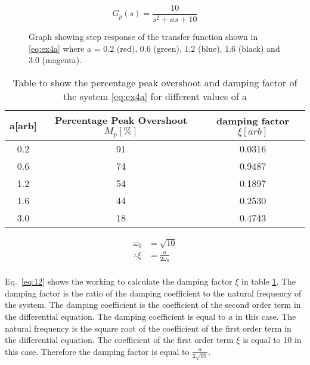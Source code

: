 \renewcommand{\ex}{ex4a}

\begin{equation}
	G_{p}\left(s\right)=\frac{10}{s^2 + as + 10}
	\label{eq:\ex}
\end{equation}


\begin{figure}[ht!]
	\centering
	
	\caption{Graph showing step response of the transfer function shown in \eqref{eq:\ex} where a = 0.2 (red), 0.6 (green), 1.2 (blue), 1.6 (black) and 3.0 (magenta). \appendixamble{\ex}}
	\label{fig:\ex}
\end{figure}\FloatBarrier


\begin{table}[ht!]
    \centering
    \begin{tabular}{|c|c|c|}
    \hline
    a{[}arb{]} & Percentage Peak Overshoot $M_p[\%]$ & damping factor $\xi[arb]$ \\ \hline
    0.2        & 91                                  & 0.0316                    \\ \hline
    0.6        & 74                                  & 0.9487                    \\ \hline
    1.2        & 54                                  & 0.1897                    \\ \hline
    1.6        & 44                                  & 0.2530                    \\ \hline
    3.0        & 18                                  & 0.4743                    \\ \hline
    \end{tabular}
    \caption{Table to show the percentage peak overshoot and damping factor of the system \eqref{eq:\ex} for different values of a}\label{table:\ex}
    \end{table}\FloatBarrier

    \begin{equation}
    \begin{split}
        \omega_0 &= \sqrt{10}\\
        \therefore \xi &= \frac{a}{2\omega_0}\\
    \end{split}\label{eq:12}
    \end{equation}

Eq.~\eqref{eq:12} shows the working to calculate the damping factor $\xi$ in table \ref{table:\ex}. The damping factor is the ratio of the damping coefficient to the natural frequency of the system. The damping coefficient is the coefficient of the second order term in the differential equation. The damping coefficient is equal to $a$ in this case. The natural frequency is the square root of the coefficient of the first order term in the differential equation. The coefficient of the first order term  $\xi$ is equal to 10 in this case. Therefore the damping factor is equal to $\frac{a}{2\sqrt{10}}$.\\

